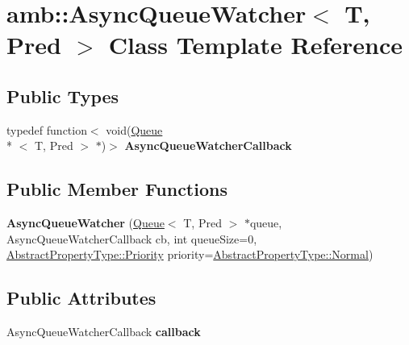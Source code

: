 \hypertarget{classamb_1_1AsyncQueueWatcher}{\section{amb\+:\+:Async\+Queue\+Watcher$<$ T, Pred $>$ Class Template Reference}
\label{classamb_1_1AsyncQueueWatcher}
}
\subsection*{Public Types}
\begin{DoxyCompactItemize}
\item 
\hypertarget{classamb_1_1AsyncQueueWatcher_a6516f6046d2da8f05b0b8e995c9d266d}{typedef function$<$ void(\hyperlink{classamb_1_1Queue}{Queue}\\*
$<$ T, Pred $>$ $\ast$)$>$ {\bfseries Async\+Queue\+Watcher\+Callback}}\label{classamb_1_1AsyncQueueWatcher_a6516f6046d2da8f05b0b8e995c9d266d}

\end{DoxyCompactItemize}
\subsection*{Public Member Functions}
\begin{DoxyCompactItemize}
\item 
\hypertarget{classamb_1_1AsyncQueueWatcher_a81e2e8e45fe104c1368a7ef250ce7469}{{\bfseries Async\+Queue\+Watcher} (\hyperlink{classamb_1_1Queue}{Queue}$<$ T, Pred $>$ $\ast$queue, Async\+Queue\+Watcher\+Callback cb, int queue\+Size=0, \hyperlink{classAbstractPropertyType_a1e513f66eb2dd2bd2cddbec16422af63}{Abstract\+Property\+Type\+::\+Priority} priority=\hyperlink{classAbstractPropertyType_a1e513f66eb2dd2bd2cddbec16422af63a3412bc77a6a781fb4a832059f1fe5d9a}{Abstract\+Property\+Type\+::\+Normal})}\label{classamb_1_1AsyncQueueWatcher_a81e2e8e45fe104c1368a7ef250ce7469}

\end{DoxyCompactItemize}
\subsection*{Public Attributes}
\begin{DoxyCompactItemize}
\item 
\hypertarget{classamb_1_1AsyncQueueWatcher_a0112d0e35911204b96256e913a065bdb}{Async\+Queue\+Watcher\+Callback {\bfseries callback}}\label{classamb_1_1AsyncQueueWatcher_a0112d0e35911204b96256e913a065bdb}

\end{DoxyCompactItemize}
